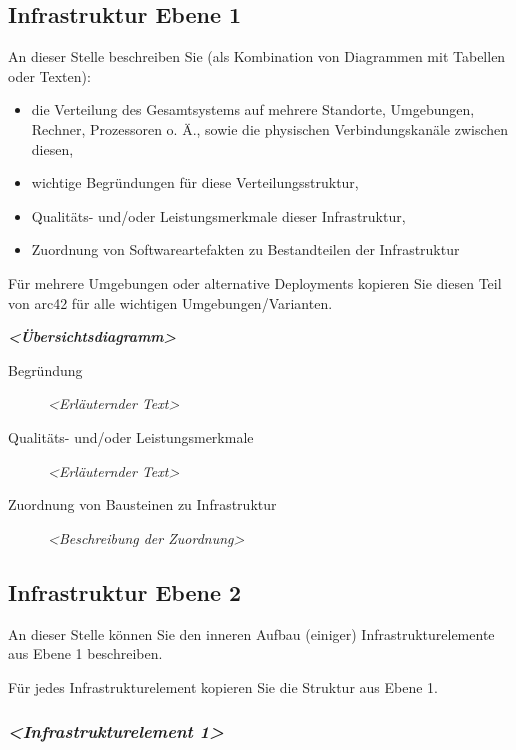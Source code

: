 \hypertarget{infrastruktur-ebene-1}{%
\subsection{Infrastruktur Ebene 1}\label{infrastruktur-ebene-1}}

An dieser Stelle beschreiben Sie (als Kombination von Diagrammen mit
Tabellen oder Texten):

\begin{itemize}
\item
  die Verteilung des Gesamtsystems auf mehrere Standorte, Umgebungen,
  Rechner, Prozessoren o. Ä., sowie die physischen Verbindungskanäle
  zwischen diesen,
\item
  wichtige Begründungen für diese Verteilungsstruktur,
\item
  Qualitäts- und/oder Leistungsmerkmale dieser Infrastruktur,
\item
  Zuordnung von Softwareartefakten zu Bestandteilen der Infrastruktur
\end{itemize}

Für mehrere Umgebungen oder alternative Deployments kopieren Sie diesen
Teil von arc42 für alle wichtigen Umgebungen/Varianten.

\textbf{\emph{\textless Übersichtsdiagramm\textgreater{}}}

\begin{description}
\item[Begründung]
\emph{\textless Erläuternder Text\textgreater{}}
\item[Qualitäts- und/oder Leistungsmerkmale]
\emph{\textless Erläuternder Text\textgreater{}}
\item[Zuordnung von Bausteinen zu Infrastruktur]
\emph{\textless Beschreibung der Zuordnung\textgreater{}}
\end{description}

\hypertarget{infrastruktur-ebene-2}{%
\subsection{Infrastruktur Ebene 2}\label{infrastruktur-ebene-2}}

An dieser Stelle können Sie den inneren Aufbau (einiger)
Infrastrukturelemente aus Ebene 1 beschreiben.

Für jedes Infrastrukturelement kopieren Sie die Struktur aus Ebene 1.

\hypertarget{infrastrukturelement-1}{%
\subsubsection{\texorpdfstring{\emph{\textless Infrastrukturelement
1\textgreater{}}}{\textless Infrastrukturelement 1\textgreater{}}}\label{infrastrukturelement-1}}

